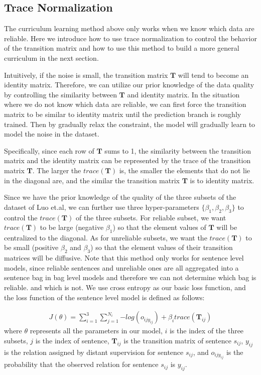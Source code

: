 \subsection{Trace Normalization}
The curriculum learning method above only works when we know which data are reliable. Here we introduce how to use trace normalization to control the behavior of the transition matrix and how to use this method to build a more general curriculum in the next section.

Intuitively, if the noise is small, the transition matrix $\mathbf{T}$ will tend to become an identity matrix. Therefore, we can utilize our prior knowledge of the data quality by controlling the similarity between $\mathbf{T}$ and identity matrix. In the situation where we do not know which data are reliable, we can first force the transition matrix to be similar to identity matrix until the prediction branch is roughly trained. Then by gradually relax the constraint, the model will gradually learn to model the noise in the dataset.

Specifically, since each row of $\mathbf{T}$ sums to 1, the similarity between the transition matrix and the identity matrix can be represented by the trace of the transition matrix $\mathbf{T}$. The larger the $trace(\mathbf{T})$ is, the smaller the elements that do not lie in the diagonal are, and the similar the transition matrix $\mathbf{T}$ is to identity matrix.

Since we have the prior knowledge of the quality of the three subsets of the dataset of Luo et.al, we can further use three hyper-parameters $\{\beta_1, \beta_2, \beta_3\}$ to control the $trace(\mathbf{T})$ of the three subsets. For reliable subset, we want $trace(\mathbf{T})$ to be large (negative $\beta_1$) so that the element values of $\mathbf{T}$ will be centralized to the diagonal. As for unreliable subsets, we want the $trace(\mathbf{T})$ to be small (positive $\beta_2$ and $\beta_3$) so that the element values of their transition matrices will be diffusive. Note that this method only works for sentence level models, since reliable sentences and unreliable ones are all aggregated into a sentence bag in bag level models and therefore we can not determine which bag is reliable. and which is not. We use cross entropy as our basic loss function, and the loss function of the sentence level model is defined as follows:

\begin{equation}
\begin{aligned}
J(\theta)=\sum_{i=1}^3{\sum_{j=1}^{N_i}{-log(o_{ijy_{ij}})}} + \beta_i trace(\mathbf{T}_{ij})
\end{aligned}
\end{equation}
where $\theta$ represents all the parameters in our model, $i$ is the index of the three subsets, $j$ is the index of sentence, $\mathbf{T}_{ij}$ is the transition matrix of sentence $s_{ij}$, $y_{ij}$ is the relation assigned by distant supervision for sentence $s_{ij}$, and $o_{ijy_{ij}}$ is the probability that the observed relation for sentence $s_{ij}$ is $y_{ij}$.

